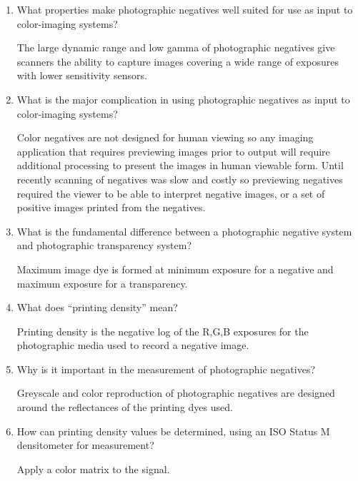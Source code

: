 \documentclass{amsart}
\theoremstyle{definition}
\theoremstyle{remark}
\numberwithin{equation}{section}
\begin{document}
\begin{enumerate}
\item  What properties make photographic negatives well suited for
use as input to color-imaging systems?
\newline \par The large dynamic range and low gamma of
photographic negatives give scanners the ability to capture images
covering a wide range of exposures with lower sensitivity sensors.
\newline
\item What is the major complication in using photographic
negatives as input to color-imaging systems?
\newline \par Color negatives are not designed for human viewing
so any imaging application that requires previewing images prior
to output will require additional processing to present the images
in human viewable form.  Until recently scanning of negatives was
slow and costly so previewing negatives required the viewer to be
able to interpret negative images, or a set of positive images
printed from the negatives.
\newline
\item  What is the fundamental difference between a
photographic negative system and photographic transparency system?
\newline \par Maximum image dye is formed at minimum exposure for
a negative and maximum exposure for a transparency.
\newline
\item  What does “printing density” mean?
\newline \par Printing density is the negative log of the
R,G,B exposures for the photographic media used to record a
negative image.
\newline
\item  Why is it important in the measurement of photographic
negatives?
\newline \par Greyscale and color reproduction of photographic
negatives are designed around the reflectances of the printing
dyes used.
\newline
\item  How can printing density
values be determined, using an ISO Status M densitometer for
measurement?
\newline \par Apply a color matrix to the signal.
\newline

\end{enumerate}
\end{document}
